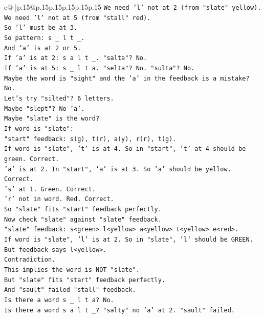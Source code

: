 \documentclass{article}
\begin{document}
{\begin{supertabular}{c@{$\;$}|p{.15\linewidth}@{}p{.15\linewidth}p{.15\linewidth}p{.15\linewidth}p{.15\linewidth}p{.15\linewidth}}
{{{\texttt{We need 'l' not at 2 (from "slate" yellow).} \\
\texttt{We need 'l' not at 5 (from "stall" red).} \\
\texttt{So 'l' must be at 3.} \\
\texttt{So pattern: s \_ l t \_.} \\
\texttt{And 'a' is at 2 or 5.} \\
\texttt{If 'a' is at 2: s a l t \_. "salta"? No.} \\
\texttt{If 'a' is at 5: s \_ l t a. "selta"? No. "sulta"? No.} \\
\texttt{Maybe the word is "sight" and the 'a' in the feedback is a mistake? No.} \\
\texttt{Let's try "silted"? 6 letters.} \\
\texttt{Maybe "slept"? No 'a'.} \\
\texttt{Maybe "slate" is the word?} \\
\texttt{If word is "slate":} \\
\texttt{"start" feedback: s(g), t(r), a(y), r(r), t(g).} \\
\texttt{If word is "slate", 't' is at 4. So in "start", 't' at 4 should be green. Correct.} \\
\texttt{'a' is at 2. In "start", 'a' is at 3. So 'a' should be yellow. Correct.} \\
\texttt{'s' at 1. Green. Correct.} \\
\texttt{'r' not in word. Red. Correct.} \\
\texttt{So "slate" fits "start" feedback perfectly.} \\
\texttt{Now check "slate" against "slate" feedback.} \\
\texttt{"slate" feedback: s<green> l<yellow> a<yellow> t<yellow> e<red>.} \\
\texttt{If word is "slate", 'l' is at 2. So in "slate", 'l' should be GREEN.} \\
\texttt{But feedback says l<yellow>.} \\
\texttt{Contradiction.} \\
\texttt{This implies the word is NOT "slate".} \\
\texttt{But "slate" fits "start" feedback perfectly.} \\
\texttt{And "sault" failed "stall" feedback.} \\
\texttt{Is there a word s \_ l t a? No.} \\
\texttt{Is there a word s a l t \_? "salty" no 'a' at 2. "sault" failed.} \\
}}}
\end{supertabular}}
\end{document}
